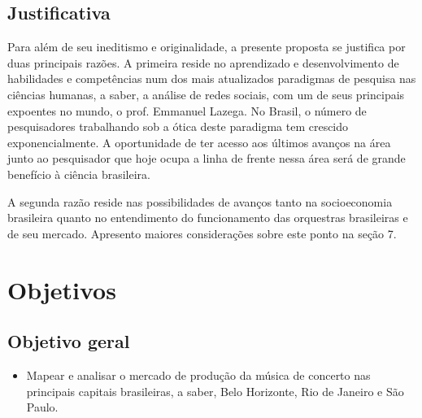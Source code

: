 \documentclass[a4paper, 12pt, openright, oneside, german, french, english, brazil, article]{abntex2}
\begin{document}



\subsection{Justificativa}

Para além de seu ineditismo e originalidade, a presente proposta se justifica por duas principais razões. A primeira reside no aprendizado e desenvolvimento de habilidades e competências num dos mais atualizados paradigmas de pesquisa nas ciências humanas, a saber, a análise de redes sociais, com um de seus principais expoentes no mundo, o prof. Emmanuel Lazega. No Brasil, o número de pesquisadores trabalhando sob a ótica deste paradigma tem crescido exponencialmente. A oportunidade de ter acesso aos últimos avanços na área junto ao pesquisador que hoje ocupa a linha de frente nessa área será de grande benefício à ciência brasileira.

A segunda razão reside nas possibilidades de avanços tanto na socioeconomia brasileira quanto no entendimento do funcionamento das orquestras brasileiras e de seu mercado. Apresento maiores considerações sobre este ponto na seção 7.





\section{Objetivos}

\subsection{Objetivo geral}

\begin{itemize}
\item Mapear e analisar o mercado de produção da música de concerto nas principais capitais brasileiras, a saber, Belo Horizonte, Rio de Janeiro e São Paulo.
\end{itemize}
\end{document}
